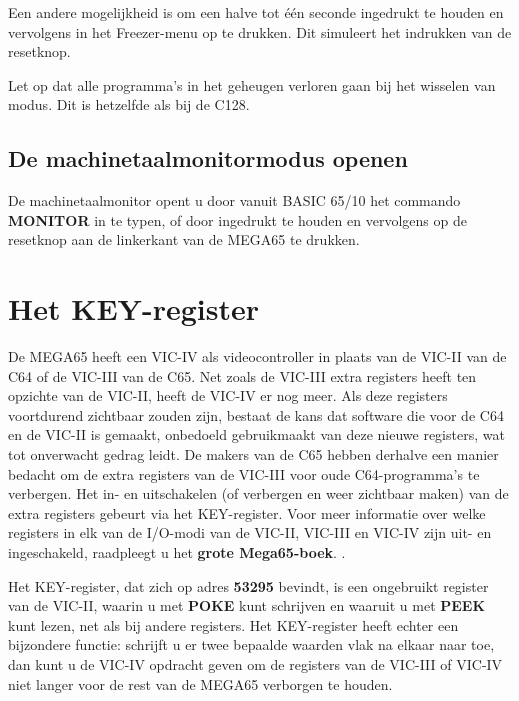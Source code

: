 Een andere mogelijkheid is om  een halve tot één seconde ingedrukt te houden en vervolgens in het Freezer-menu op  te drukken. Dit simuleert het indrukken van de resetknop.

Let op dat alle programma's in het geheugen verloren gaan bij het wisselen van modus. Dit is hetzelfde als bij de C128.

\subsection{De machinetaalmonitormodus openen}

De machinetaalmonitor opent u door vanuit BASIC 65/10 het commando {\bf MONITOR} in te typen, of door  ingedrukt te houden en vervolgens op de resetknop aan de linkerkant van de MEGA65 te drukken.

\section{Het KEY-register}

De MEGA65 heeft een VIC-IV als videocontroller in plaats van de VIC-II van de C64 of de VIC-III van de C65. Net zoals de VIC-III extra registers heeft ten opzichte van de VIC-II, heeft de VIC-IV er nog meer. Als deze registers voortdurend zichtbaar zouden zijn, bestaat de kans dat software die voor de C64 en de VIC-II is gemaakt, onbedoeld gebruikmaakt van deze nieuwe registers, wat tot onverwacht gedrag leidt. De makers van de C65 hebben derhalve een manier bedacht om de extra registers van de VIC-III voor oude C64-programma's te verbergen. Het in- en uitschakelen (of verbergen en weer zichtbaar maken) van de extra registers gebeurt via het KEY-register. Voor meer informatie over welke registers in elk van de I/O-modi van de VIC-II, VIC-III en VIC-IV zijn uit- en ingeschakeld, raadpleegt u
\ifdefined\printmanual
 het {\bf grote Mega65-boek}.
\else
 .
\fi


Het KEY-register, dat zich op adres {\bf 53295} bevindt, is een ongebruikt register van de VIC-II, waarin u met {\bf POKE} kunt schrijven en waaruit u met {\bf PEEK} kunt lezen, net als bij andere registers. Het KEY-register heeft echter een bijzondere functie: schrijft u er twee bepaalde waarden vlak na elkaar naar toe, dan kunt u de VIC-IV opdracht geven om de registers van de VIC-III of VIC-IV niet langer voor de rest van de MEGA65 verborgen te houden.

